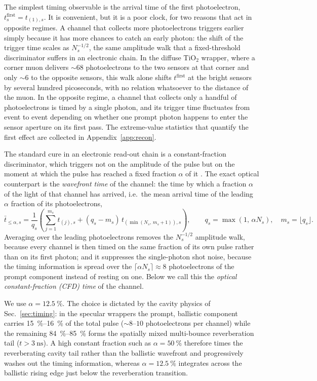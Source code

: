 \documentclass[11pt,a4paper]{article}
\begin{document}
The simplest timing observable is the arrival time of the first photoelectron,
$t^{\mathrm{first}}_s = t_{(1),s}$.  It is convenient, but it is a poor clock,
for two reasons that act in opposite regimes.  A channel that collects more
photoelectrons triggers earlier simply because it has more chances to catch an
early photon: the shift of the trigger time scales as $N_s^{-1/2}$, the same
amplitude walk that a fixed-threshold discriminator suffers in an electronic
chain.  In the diffuse TiO$_2$ wrapper, where a corner muon delivers
$\sim 68$ photoelectrons to the two sensors at that corner and only $\sim 6$ to
the opposite sensors, this walk alone shifts $t^{\mathrm{first}}$ at the bright
sensors by several hundred picoseconds, with no relation whatsoever to the
distance of the muon.  In the opposite regime, a channel that collects only a
handful of photoelectrons is timed by a single photon, and its trigger time
fluctuates from event to event depending on whether one prompt photon happens
to enter the sensor aperture on its first pass.  The extreme-value statistics
that quantify the first effect are collected in Appendix~\ref{app:recon}.

The standard cure in an electronic read-out chain is a constant-fraction
discriminator, which triggers not on the amplitude of the pulse but on the
moment at which the pulse has reached a fixed fraction $\alpha$ of it
\cite{Gundacker2020}.  The exact optical counterpart is the \emph{wavefront
time} of the channel: the time by which a fraction $\alpha$ of the light of
that channel has arrived, i.e.\ the mean arrival time of the leading $\alpha$
fraction of its photoelectrons,
\begin{equation}
  \bar t_{\le\alpha,s}
  = \frac{1}{q_s}\!\left(
      \sum_{j=1}^{m_s} t_{(j),s}
      + (q_s - m_s)\,t_{(\min(N_s,\,m_s+1)),s}
    \right),
  \qquad
  q_s = \max(1,\,\alpha N_s), \quad m_s = \lfloor q_s \rfloor .
  \label{eq:tcfd-mean}
\end{equation}
Averaging over the leading photoelectrons removes the $N_s^{-1/2}$ amplitude
walk, because every channel is then timed on the same fraction of its own
pulse rather than on its first photon; and it suppresses the single-photon
shot noise, because the timing information is spread over the
$\lceil \alpha N_s\rceil \approx 8$ photoelectrons of the prompt component
instead of resting on one.  Below we call this the \emph{optical
constant-fraction (CFD) time} of the channel.

We use $\alpha = \SI{12.5}{\percent}$.  The choice is dictated by the cavity
physics of Sec.~\ref{sec:timing}: in the specular wrappers the prompt,
ballistic component carries \SIrange{15}{16}{\percent} of the total pulse
($\sim 8\text{--}10$ photoelectrons per channel) while the remaining
\SIrange{84}{85}{\percent} forms the spatially mixed multi-bounce
reverberation tail ($t > \SI{3}{\nano\second}$).  A high constant fraction
such as $\alpha = \SI{50}{\percent}$ therefore times the reverberating cavity
tail rather than the ballistic wavefront and progressively washes out the
timing information, whereas $\alpha = \SI{12.5}{\percent}$ integrates across
the ballistic rising edge just below the reverberation transition.
\end{document}

